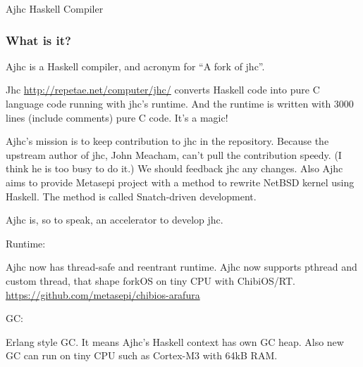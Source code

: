 \documentclass[DIV16,twocolumn,10pt]{scrreprt}
\begin{document}
\begin{hcarentry}{Ajhc Haskell Compiler}
\makeheader

\newcommand{\WhatsIsIt}{\subsubsection*{What is it?}}
\newcommand{\Usage}{\subsubsection*{Usage}}
\newcommand{\License}{\subsubsection*{License}}
\newcommand{\Demo}{\subsubsection*{Demonstrations}}

\WhatsIsIt

Ajhc is a Haskell compiler, and acronym for ``A fork of jhc''.

Jhc \url{http://repetae.net/computer/jhc/} converts Haskell code into pure C language code running with jhc's runtime. And the runtime is written with 3000 lines (include comments) pure C code. It's a magic!

Ajhc's mission is to keep contribution to jhc in the repository. Because the upstream author of jhc, John Meacham, can't pull the contribution speedy. (I think he is too busy to do it.) We should feedback jhc any changes. Also Ajhc aims to provide Metasepi project with a method to rewrite NetBSD kernel using Haskell. The method is called Snatch-driven development.

Ajhc is, so to speak, an accelerator to develop jhc.

\WhatsNew

\noindent Runtime:

Ajhc now has thread-safe and reentrant runtime.
Ajhc now supports pthread and custom thread, that shape forkOS on tiny CPU with ChibiOS/RT.
\url{https://github.com/metasepi/chibios-arafura}

\vspace*{10pt}

\noindent GC:

Erlang style GC. It means Ajhc's Haskell context has own GC heap.
Also new GC can run on tiny CPU such as Cortex-M3 with 64kB RAM.


\end{hcarentry}
\end{document}
